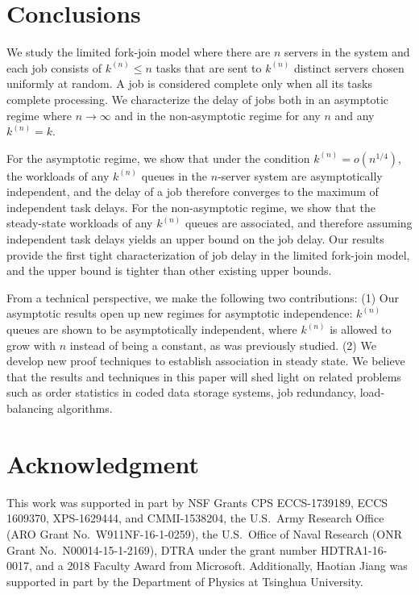 \documentclass[sigconf]{acmart}
\newcommand{\supn}{^{(n)}}
\begin{document}
\section{Conclusions}\label{sec:conclusions}
We study the limited fork-join model where there are $n$ servers in the system and each job consists of $k\supn\le n$ tasks that are sent to $k\supn$ distinct servers chosen uniformly at random.  A job is considered complete only when all its tasks complete processing.  We characterize the delay of jobs both in an asymptotic regime where $n\to\infty$ and in the non-asymptotic regime for any $n$ and any $k\supn=k$.

For the asymptotic regime, we show that under the condition $k\supn=o(n^{1/4})$, the workloads of any $k\supn$ queues in the $n$-server system are asymptotically independent, and the delay of a job therefore converges to the maximum of independent task delays.  For the non-asymptotic regime, we show that the steady-state workloads of any $k\supn$ queues are associated, and therefore assuming independent task delays yields an upper bound on the job delay.  Our results provide the first tight characterization of job delay in the limited fork-join model, and the upper bound is tighter than other existing upper bounds.

From a technical perspective, we make the following two contributions: (1) Our asymptotic results open up new regimes for asymptotic independence: $k\supn$ queues are shown to be asymptotically independent, where $k\supn$ is allowed to grow with $n$ instead of being a constant, as was previously studied. (2) We develop new proof techniques to establish association in steady state. We believe that the results and techniques in this paper will shed light on related problems such as order statistics in coded data storage systems, job redundancy, load-balancing algorithms.

\section{Acknowledgment}
\begin{sloppypar}
This work was supported in part by NSF Grants CPS ECCS-1739189, ECCS 1609370, XPS-1629444, and CMMI-1538204, the U.S.\ Army Research Office (ARO Grant No.\ W911NF-16-1-0259), the U.S.\ Office of Naval Research (ONR Grant No.\ N00014-15-1-2169), DTRA under the grant number HDTRA1-16-0017, and a 2018 Faculty Award from Microsoft. Additionally, Haotian Jiang was supported in part by the Department of Physics at Tsinghua University.
\end{sloppypar}
\end{document}
